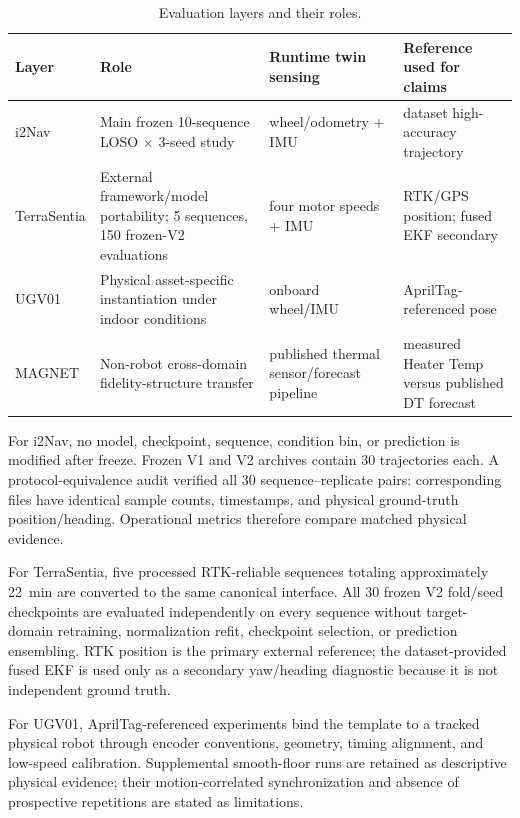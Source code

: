 \documentclass[journal]{IEEEtran}
\begin{document}
\begin{table}[t]
\caption{Evaluation layers and their roles.}
\label{tab:datasets}
\centering
\footnotesize
\begin{tabular}{p{}p{}p{}p{}}
\toprule
Layer & Role & Runtime twin sensing & Reference used for claims \\
\midrule
i2Nav & Main frozen 10-sequence LOSO $\times$ 3-seed study & wheel/odometry + IMU & dataset high-accuracy trajectory \\
TerraSentia & External framework/model portability; 5 sequences, 150 frozen-V2 evaluations & four motor speeds + IMU & RTK/GPS position; fused EKF secondary \\
UGV01 & Physical asset-specific instantiation under indoor conditions & onboard wheel/IMU & AprilTag-referenced pose \\
MAGNET & Non-robot cross-domain fidelity-structure transfer & published thermal sensor/forecast pipeline & measured Heater Temp versus published DT forecast \\
\bottomrule
\end{tabular}
\end{table}

For i2Nav, no model, checkpoint, sequence, condition bin, or prediction is modified after freeze. Frozen V1 and V2 archives contain 30 trajectories each. A protocol-equivalence audit verified all 30 sequence--replicate pairs: corresponding files have identical sample counts, timestamps, and physical ground-truth position/heading. Operational metrics therefore compare matched physical evidence.

For TerraSentia, five processed RTK-reliable sequences totaling approximately 22~min are converted to the same canonical interface. All 30 frozen V2 fold/seed checkpoints are evaluated independently on every sequence without target-domain retraining, normalization refit, checkpoint selection, or prediction ensembling. RTK position is the primary external reference; the dataset-provided fused EKF is used only as a secondary yaw/heading diagnostic because it is not independent ground truth.

For UGV01, AprilTag-referenced experiments bind the template to a tracked physical robot through encoder conventions, geometry, timing alignment, and low-speed calibration. Supplemental smooth-floor runs are retained as descriptive physical evidence; their motion-correlated synchronization and absence of prospective repetitions are stated as limitations.
\end{document}
